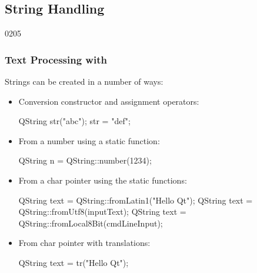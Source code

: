 %
%
%
%

\subsection{String Handling}


\begin{slide}[fragile]{0205}\frametitle{Text Processing with }
  \label{text_processing}
  Strings can be created in a number of ways:
  \begin{itemize}
  \item Conversion constructor and assignment operators:
 \begin{cpp}
QString str("abc");
str = "def";
  \end{cpp}
 \item From a number using a static function:
 \begin{cpp}
QString n = QString::number(1234);
  \end{cpp}
 \item From a char pointer using the static functions:
 \begin{cpp}
QString text = QString::fromLatin1("Hello Qt");
QString text = QString::fromUtf8(inputText);
QString text = QString::fromLocal8Bit(cmdLineInput);
  \end{cpp}
\item From char pointer with translations:
  \begin{cpp}
QString text = tr("Hello Qt");
  \end{cpp}
\end{itemize}
\end{slide}

